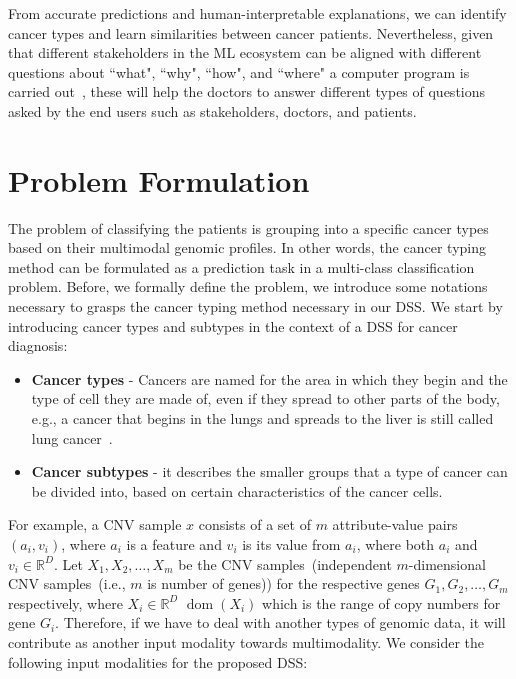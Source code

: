 \hspace*{3.5mm} From accurate predictions and human-interpretable explanations, we can identify cancer types and learn similarities between cancer patients. Nevertheless, given that different stakeholders in the ML ecosystem can be aligned with different questions about ``what", ``why", ``how", and ``where" a computer program is carried out~\cite{zednik2019solving}, these will help the doctors to answer different types of questions asked by the end users such as stakeholders, doctors, and patients.  

\section{Problem Formulation} \label{problem_challenges}
The problem of classifying the patients is grouping into a specific cancer types based on their multimodal genomic profiles. In other words, the cancer typing method can be formulated as a prediction task in a multi-class classification problem. Before, we formally define the problem, we introduce some notations necessary to grasps the cancer typing method necessary in our DSS. We start by introducing cancer types and subtypes in the context of a DSS for cancer diagnosis: 

\begin{itemize}[noitemsep]
    \item \textbf{Cancer types} - Cancers are named for the area in which they begin and the type of cell they are made of, even if they spread to other parts of the body, e.g., a cancer that begins in the lungs and spreads to the liver is still called lung cancer~\cite{19Cruz}. 
    \item \textbf{Cancer subtypes} - it describes the smaller groups that a type of cancer can be divided into, based on certain characteristics of the cancer cells.  %
\end{itemize}

\hspace*{3.5mm} For example, a CNV sample $x$ consists of a set of $m$ attribute-value pairs $\left(a_{i}, v_{i}\right)$, where $a_i$ is a feature and $v_i$ is its value from $a_{i}$, where both $a_{i}$ and $v_i \in \mathbb{R}^{D}$. Let $X_{1}, X_{2}, \ldots, X_{m}$ be the CNV samples~(independent $m$-dimensional CNV samples~(i.e., $m$ is number of genes)) for the respective genes $G_{1}, G_{2}, \ldots, G_{m}$ respectively, where $X_{i} \in \mathbb{R}^{D}$ $\operatorname{dom}\left(X_{i}\right)$ which is the range of copy numbers for gene $G_{i}$. Therefore, if we have to deal with another types of genomic data, it will contribute as another input modality towards multimodality. We consider the following input modalities for the proposed DSS:    

